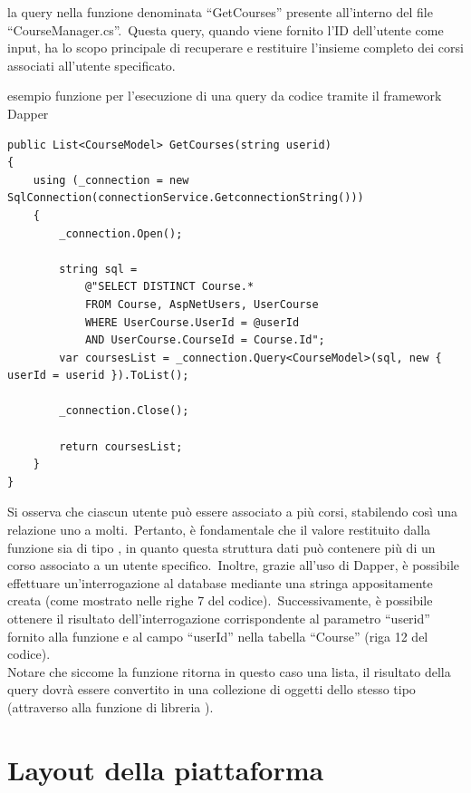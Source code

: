 la query nella funzione denominata ``GetCourses'' presente all'interno del file ``CourseManager.cs''.\ Questa query, 
quando viene fornito l'ID dell'utente come input, ha lo scopo principale di recuperare e restituire 
l'insieme completo dei corsi associati all'utente specificato.
%
\begin{algorithm}[H]
	\caption{esempio funzione per l'esecuzione di una query da codice tramite il framework Dapper}
	\label{lst:genic_mpi}
	\begin{lstlisting}[label=lst:test]
public List<CourseModel> GetCourses(string userid)
{
	using (_connection = new SqlConnection(connectionService.GetconnectionString()))
	{
		_connection.Open();

		string sql = 
			@"SELECT DISTINCT Course.* 
			FROM Course, AspNetUsers, UserCourse 
			WHERE UserCourse.UserId = @userId     
			AND UserCourse.CourseId = Course.Id";
		var coursesList = _connection.Query<CourseModel>(sql, new { userId = userid }).ToList();

		_connection.Close();

		return coursesList;
	}
} 
	\end{lstlisting}
\end{algorithm}
%
Si osserva che ciascun utente può essere associato a più corsi, 
stabilendo così una relazione uno a molti.\ Pertanto, è fondamentale 
che il valore restituito dalla funzione sia di tipo , 
in quanto questa struttura dati può contenere più di un corso associato a 
un utente specifico.\ Inoltre, grazie all'uso di Dapper, è possibile effettuare 
un'interrogazione al database mediante una stringa appositamente creata 
(come mostrato nelle righe 7 del codice).\ Successivamente, è possibile 
ottenere il risultato dell'interrogazione corrispondente al parametro ``userid'' 
fornito alla funzione e al campo ``userId'' nella tabella ``Course'' (riga 12 del codice).
\\
Notare che siccome la funzione ritorna in questo caso una lista, il risultato della query
dovrà essere convertito in una collezione di oggetti dello stesso tipo (attraverso alla funzione di libreria ).

\section{Layout della piattaforma}\label{sec:cap_sec_subsec}